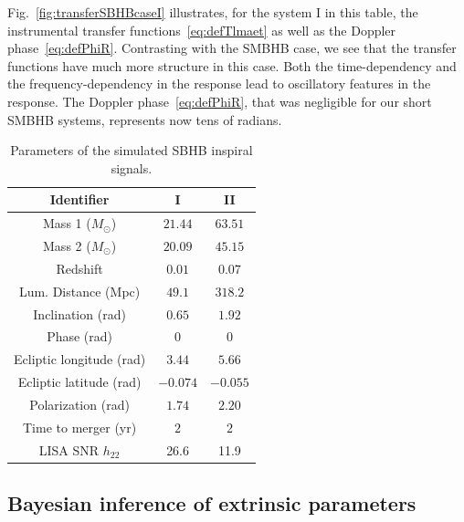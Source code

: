 \documentclass[aps,showpacs,twocolumn,prd,superscriptaddress,nofootinbib]{revtex4-1}
\newcommand{\Msol}{M_{\odot}}
\begin{document}
Fig.~\ref{fig:transferSBHBcaseI} illustrates, for the system I in this table, the instrumental transfer functions~\eqref{eq:defTlmaet} as well as the Doppler phase~\eqref{eq:defPhiR}. Contrasting with the SMBHB case, we see that the transfer functions have much more structure in this case. Both the time-dependency and the frequency-dependency in the response lead to oscillatory features in the response. The Doppler phase~\eqref{eq:defPhiR}, that was negligible for our short SMBHB systems, represents now tens of radians.


\begin{table}
	\begin{tabular}{|c||c|c|}
		\hline
		Identifier 		& I 	& II   \\
		\hline
		\hline
		Mass 1 ($\Msol$) 	& $21.44$ & $63.51$ \\
		\hline
		Mass 2 ($\Msol$) 	& $20.09$ & $45.15$ \\
		\hline
		Redshift 		& $0.01$ & $0.07$ \\
		\hline
		Lum. Distance (Mpc) 		&  $49.1$ & $318.2$\\
		\hline
		Inclination (rad) 		& $0.65$ & $1.92$ \\
		\hline
		Phase (rad) 			& $0$	& $0$ \\
		\hline
		Ecliptic longitude (rad) 			& $3.44$	& $5.66$ \\
		\hline
		Ecliptic latitude (rad) 			& $-0.074$	& $-0.055$ \\
		\hline
		Polarization (rad) 			& $1.74$	& $2.20$ \\
		\hline
		Time to merger (yr) 			& $2$	& $2$ \\
		\hline
		\hline
		LISA SNR $h_{22}$			& 26.6 & 11.9 \\
		\hline
	\end{tabular}
	\caption{Parameters of the simulated SBHB inspiral signals.}
	\label{tab:SBHBparams}
\end{table}


\subsection{Bayesian inference of extrinsic parameters}
\label{subsec:PESBHB}
\end{document}
